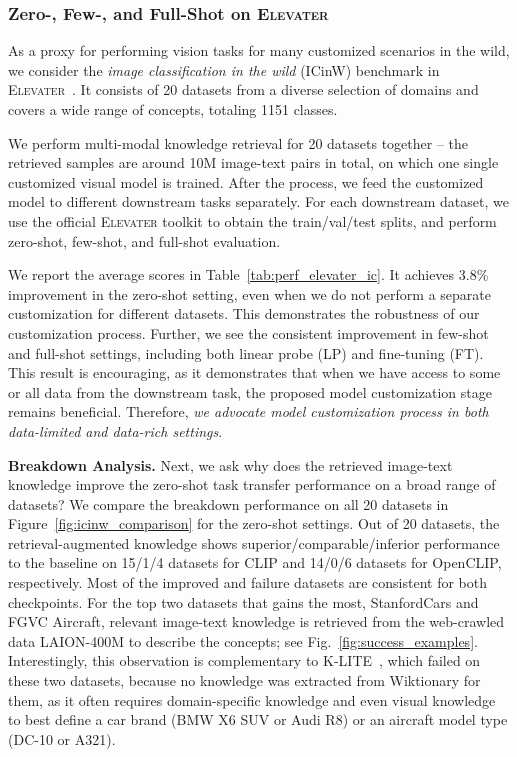 \documentclass[10pt,twocolumn,letterpaper]{article}
\renewcommand{\paragraph}[1]{\vspace{1.25mm}\noindent\textbf{#1}}
\begin{document}
\vspace{-2mm}
\subsubsection{Zero-, Few-, and Full-Shot on \textsc{Elevater}}
\vspace{-2mm}
As a proxy for performing vision tasks for many customized scenarios in the wild, we consider the {\it image classification in the wild} (ICinW) benchmark in \textsc{Elevater}~\cite{li2022elevater}. It consists of 20 datasets from a diverse selection of domains and covers a wide range of concepts, totaling 1151 classes.

We perform multi-modal knowledge retrieval for 20 datasets together -- the retrieved samples are around 10M image-text pairs in total, on which one single customized visual  model is trained. 
After the process, we feed the customized model to different downstream tasks separately.  For each downstream dataset, we use the official \textsc{Elevater} toolkit to obtain the train/val/test splits, and perform zero-shot, few-shot, and full-shot evaluation. 


We report the average scores in Table~\ref{tab:perf_elevater_ic}.
It achieves 3.8\% improvement in the zero-shot setting, even when we do not perform a separate customization for different datasets. This demonstrates the robustness of our customization process.
Further, we see the consistent improvement in few-shot and full-shot settings, including both linear probe (LP) and fine-tuning (FT). This result is encouraging, as it demonstrates that when we have access to some or all data from the downstream task, the proposed model customization stage remains beneficial.  Therefore, \emph{we advocate model customization process in both data-limited and data-rich settings}.


\paragraph{Breakdown Analysis.} Next, we ask why does the retrieved image-text knowledge improve the zero-shot task transfer performance on a broad range of datasets? We compare the breakdown performance on all 20 datasets in Figure~\ref{fig:icinw_comparison} for the zero-shot settings. Out of 20 datasets, the retrieval-augmented knowledge shows superior/comparable/inferior performance to the baseline on 15/1/4 datasets for CLIP and  14/0/6 datasets for OpenCLIP, respectively. Most of the improved and failure datasets are consistent for both checkpoints. For the top two datasets that gains the most, \ie StanfordCars and FGVC Aircraft, relevant image-text knowledge is retrieved from the web-crawled data LAION-400M to describe the concepts; see Fig.~\ref{fig:success_examples}. 
Interestingly, this observation is complementary to K-LITE~\cite{shen2022klite}, which failed on these two datasets, because  no knowledge was extracted from Wiktionary for them, as it often requires domain-specific knowledge and even visual knowledge to best define a car brand (\eg BMW X6 SUV or Audi R8) or an aircraft model type (\eg DC-10 or A321).
\end{document}
